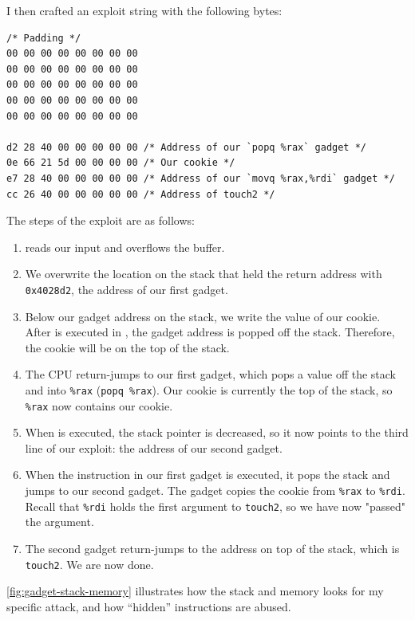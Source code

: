 I then crafted an exploit string with the following bytes:

\begin{verbatim}
/* Padding */
00 00 00 00 00 00 00 00
00 00 00 00 00 00 00 00
00 00 00 00 00 00 00 00
00 00 00 00 00 00 00 00
00 00 00 00 00 00 00 00

d2 28 40 00 00 00 00 00 /* Address of our `popq %rax` gadget */
0e 66 21 5d 00 00 00 00 /* Our cookie */
e7 28 40 00 00 00 00 00 /* Address of our `movq %rax,%rdi` gadget */
cc 26 40 00 00 00 00 00 /* Address of touch2 */
\end{verbatim}

The steps of the exploit are as follows:

\begin{enumerate}
  \item {} reads our input and overflows the buffer.
  \item We overwrite the location on the stack that held the return address with \texttt{0x4028d2}, the address of our first gadget.
  \item Below our gadget address on the stack, we write the value of our cookie. After  is executed in , the gadget address is popped off the stack. Therefore, the cookie will be on the top of the stack.
  \item The CPU return-jumps to our first gadget, which pops a value off the stack and into \texttt{\%rax} (\texttt{popq \%rax}). Our cookie is currently the top of the stack, so \texttt{\%rax} now contains our cookie.
  \item When  is executed, the stack pointer is decreased, so it now points to the third line of our exploit: the address of our second gadget.
  \item When the  instruction in our first gadget is executed, it pops the stack and jumps to our second gadget. The gadget copies the cookie from \texttt{\%rax} to \texttt{\%rdi}. Recall that \texttt{\%rdi} holds the first argument to \texttt{touch2}, so we have now "passed" the argument.
  \item The second gadget return-jumps to the address on top of the stack, which is \texttt{touch2}. We are now done.
\end{enumerate}

\autoref{fig:gadget-stack-memory} illustrates how the stack and memory looks for my specific attack, and how ``hidden'' instructions are abused.

